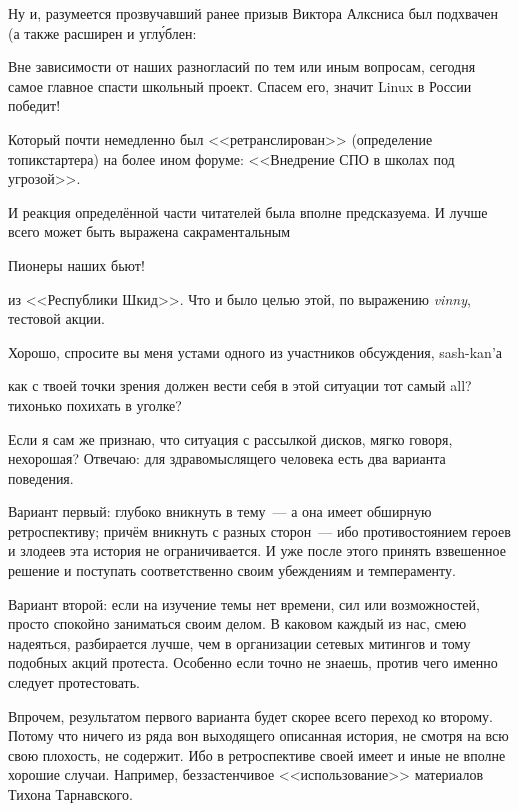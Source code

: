 Ну и, разумеется прозвучавший ранее призыв Виктора Алксниса был подхвачен (а также расширен и угл\'{у}блен:


\begin{shadequote}{}
Вне зависимости от наших разногласий по тем или иным вопросам, сегодня самое главное спасти школьный проект. Спасем его, значит Linux в России победит!
\end{shadequote}

Который почти немедленно был <<ретранслирован>> (определение топикстартера) на более ином форуме: <<Внедрение СПО в школах под угрозой>>.

И реакция определённой части читателей была вполне предсказуема. И лучше всего может быть выражена сакраментальным


\begin{shadequote}{}
Пионеры наших бьют!
\end{shadequote}
из <<Республики Шкид>>. Что и было целью этой, по выражению \textsl{vinny}, тестовой акции.

Хорошо, спросите вы меня устами одного из участников обсуждения, sash-kan'а


\begin{shadequote}{}
как с твоей точки зрения должен вести себя в этой ситуации тот самый all? тихонько похихать в уголке?
\end{shadequote}

Если я сам же признаю, что ситуация с рассылкой дисков, мягко говоря, нехорошая? Отвечаю: для здравомыслящего человека есть два варианта поведения.

Вариант первый: глубоко вникнуть в тему~--- а она имеет обширную ретроспективу; причём вникнуть с разных сторон~--- ибо противостоянием героев и злодеев эта история не ограничивается. И уже после этого принять взвешенное решение и поступать соответственно своим убеждениям и темпераменту.

Вариант второй: если на изучение темы нет времени, сил или возможностей, просто спокойно заниматься своим делом. В каковом каждый из нас, смею надеяться, разбирается лучше, чем в организации сетевых митингов и тому подобных акций протеста. Особенно если точно не знаешь, против чего именно следует протестовать.

Впрочем, результатом первого варианта будет скорее всего переход ко второму. Потому что ничего из ряда вон выходящего описанная история, не смотря на всю свою плохость, не содержит. Ибо в ретроспективе своей имеет и иные не вполне хорошие случаи. Например, беззастенчивое <<использование>> материалов Тихона Тарнавского.

